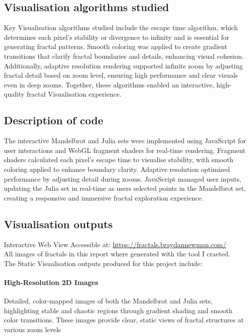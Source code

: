 \documentclass[12pt,a4paper]{report}
\begin{document}
\subsection{Visualisation algorithms studied}
Key Visualisation algorithms studied include the escape time algorithm, which determines each pixel’s stability or divergence to infinity and is essential for generating fractal patterns. Smooth coloring was applied to create gradient transitions that clarify fractal boundaries and details, enhancing visual cohesion. Additionally, adaptive resolution rendering supported infinite zoom by adjusting fractal detail based on zoom level, ensuring high performance and clear visuals even in deep zooms. Together, these algorithms enabled an interactive, high-quality fractal Visualisation experience. 

\subsection{Description of code}
The interactive Mandelbrot and Julia sets were implemented using JavaScript for user interactions and WebGL fragment shaders for real-time rendering. Fragment shaders calculated each pixel’s escape time to visualise stability, with smooth coloring applied to enhance boundary clarity. Adaptive resolution optimized performance by adjusting detail during zooms. JavaScript managed user inputs, updating the Julia set in real-time as users selected points in the Mandelbrot set, creating a responsive and immersive fractal exploration experience.

\subsection{Visualisation outputs}

Interactive Web View Accessible at: \url{https://fractals.braydannewman.com/}
\\
All images of fractals in this report where generated with the tool I craeted.\
\\
The Static Visualisation outputs produced for this project include: 

\paragraph{High-Resolution 2D Images}
Detailed, color-mapped images of both the Mandelbrot and Julia sets, highlighting stable and chaotic regions through gradient shading and smooth color transitions. These images provide clear, static views of fractal structures at various zoom levels
\end{document}
